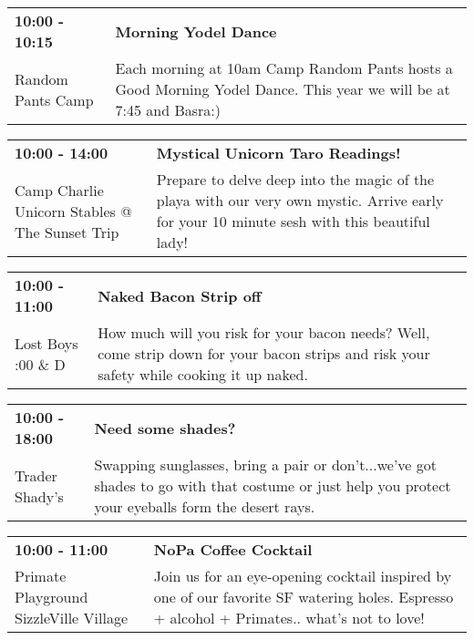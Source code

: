 \begin{tabular}{ p{1in} p{2.2in} }
    \textbf{10:00 - 10:15} & \textbf{Morning Yodel Dance} \\
    Random Pants Camp \newline  & Each morning at 10am Camp Random Pants hosts a Good Morning Yodel Dance. This year we will be at 7:45 and Basra:) \\
    \hline 
\end{tabular}
    
\begin{tabular}{ p{1in} p{2.2in} }
    \textbf{10:00 - 14:00} & \textbf{Mystical Unicorn Taro Readings! } \\
    Camp Charlie \newline Unicorn Stables @ The Sunset Trip & Prepare to delve deep into the magic of the playa with our very own mystic.  Arrive early for your 10 minute sesh with this beautiful lady! \\
    \hline 
\end{tabular}
    
\begin{tabular}{ p{1in} p{2.2in} }
    \textbf{10:00 - 11:00} & \textbf{Naked Bacon Strip off} \\
    Lost Boys \newline 4:00 \& D & How much will you risk for your bacon needs? Well, come strip down for your bacon strips and risk your safety while cooking it up naked. \\
    \hline 
\end{tabular}
    
\begin{tabular}{ p{1in} p{2.2in} }
    \textbf{10:00 - 18:00} & \textbf{Need some shades?} \\
    Trader Shady's \newline  & Swapping sunglasses, bring a pair or don't...we've got shades to go with that costume or just help you protect your eyeballs form the desert rays. \\
    \hline 
\end{tabular}
    
\begin{tabular}{ p{1in} p{2.2in} }
    \textbf{10:00 - 11:00} & \textbf{NoPa Coffee Cocktail} \\
    Primate Playground \newline SizzleVille Village & Join us for an eye-opening cocktail inspired by one of our favorite SF watering holes. Espresso + alcohol + Primates.. what's not to love! \\
    \hline 
\end{tabular}
    
